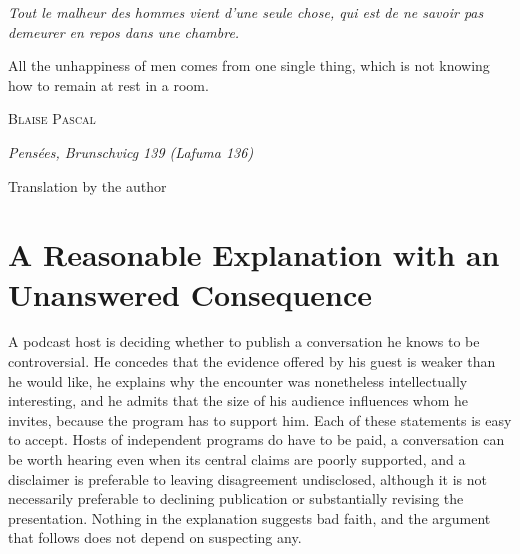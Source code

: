 \documentclass[12pt]{article}
\theoremstyle{plain}
\theoremstyle{definition}
\begin{document}
\begingroup
\thispagestyle{empty}
\selectfont
\vspace*{\fill}
\begin{center}
\begin{minipage}{0.7\textwidth}
\centering
{\Large\itshape Tout le malheur des hommes vient d'une seule chose, qui est de ne savoir pas demeurer en repos dans une chambre.\par}

\vspace{1.2em}

{\large All the unhappiness of men comes from one single thing, which is not knowing how to remain at rest in a room.\par}

\vspace{1.5em}

{\normalsize\scshape Blaise Pascal\par}
\vspace{0.3em}
{\small\itshape Pens\'ees\upshape, Brunschvicg 139 (Lafuma 136)\par}
\vspace{0.2em}
{\footnotesize Translation by the author\par}
\end{minipage}
\end{center}
\vspace*{\fill}
\clearpage
\endgroup

\setcounter{page}{1}

\section{A Reasonable Explanation with an Unanswered Consequence}

A podcast host is deciding whether to publish a conversation he knows to be controversial. He concedes that the evidence offered by his guest is weaker than he would like, he explains why the encounter was nonetheless intellectually interesting, and he admits that the size of his audience influences whom he invites, because the program has to support him. Each of these statements is easy to accept. Hosts of independent programs do have to be paid, a conversation can be worth hearing even when its central claims are poorly supported, and a disclaimer is preferable to leaving disagreement undisclosed, although it is not necessarily preferable to declining publication or substantially revising the presentation. Nothing in the explanation suggests bad faith, and the argument that follows does not depend on suspecting any.
\end{document}
